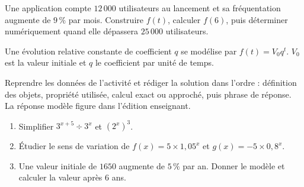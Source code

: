 \begin{activite}
Une application compte $12\,000$ utilisateurs au lancement et sa fréquentation augmente de $9\,\%$ par mois. Construire $f(t)$, calculer $f(6)$, puis déterminer numériquement quand elle dépassera $25\,000$ utilisateurs.
\begin{center}\end{center}
\end{activite}

\begin{traceecrite}Une évolution relative constante de coefficient $q$ se modélise par $f(t)=V_0q^t$. $V_0$ est la valeur initiale et $q$ le coefficient par unité de temps.\end{traceecrite}

\begin{exemple}
Reprendre les données de l'activité et rédiger la solution dans l'ordre : définition des objets, propriété utilisée, calcul exact ou approché, puis phrase de réponse. La réponse modèle figure dans l'édition enseignant.
\end{exemple}

\begin{exercice}[-- essentiel]
\begin{enumerate}\item Simplifier $3^{x+5}\div3^x$ et $(2^x)^3$.\item Étudier le sens de variation de $f(x)=5\times1{,}05^x$ et $g(x)=-5\times0{,}8^x$.\item Une valeur initiale de $1650$ augmente de $5\,\%$ par an. Donner le modèle et calculer la valeur après $6$ ans.\end{enumerate}
\end{exercice}

